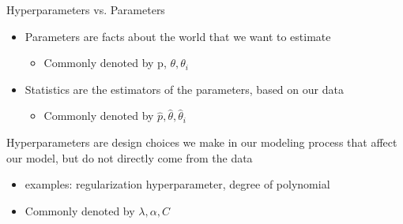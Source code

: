 \documentclass[aspectratio=169]{../latex_main/tntbeamer}  %
\begin{document}
	
	\begin{frame}{Hyperparameters vs. Parameters}
        \begin{itemize}
            \item Parameters are facts about the world that we want to estimate
            \begin{itemize}
                \item Commonly denoted by p, $\theta, \theta_i$
            \end{itemize}
            \item Statistics are the estimators of the parameters, based on our data
            \begin{itemize}
                \item Commonly denoted by $\hat{p}, \hat{\theta}, \hat{\theta}_i$
            \end{itemize}
        \end{itemize}
        \bigskip
        Hyperparameters are design choices we make in our modeling process that affect our model, but do not directly come from the data

        \begin{itemize}
            \item examples: regularization hyperparameter, degree of polynomial
            \item Commonly denoted by $\lambda, \alpha, C$
        \end{itemize}
	\end{frame}
\end{document}
